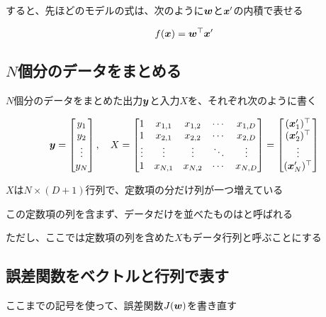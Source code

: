 \documentclass[../../../topic_machine-learning]{subfiles}
\begin{document}
すると、先ほどのモデルの式は、次のように$\vb*{w}$と$\vb*{x}'$の内積で表せる

\begin{equation*}
  f(\vb*{x}) = \vb*{w}^\top\vb*{x}'
\end{equation*}

\subsection{$N$個分のデータをまとめる}

$N$個分のデータをまとめた出力$\vb*{y}$と入力$X$を、それぞれ次のように書く

\begin{equation*}
  \vb*{y} = \begin{bmatrix}
    y_1    \\
    y_2    \\
    \vdots \\
    y_N
  \end{bmatrix},\quad
  X = \begin{bmatrix}
    1      & x_{1,1} & x_{1,2} & \cdots & x_{1,D} \\
    1      & x_{2,1} & x_{2,2} & \cdots & x_{2,D} \\
    \vdots & \vdots  & \vdots  & \ddots & \vdots  \\
    1      & x_{N,1} & x_{N,2} & \cdots & x_{N,D}
  \end{bmatrix} = \begin{bmatrix}
    (\vb*{x}'_1)^\top \\
    (\vb*{x}'_2)^\top \\
    \vdots            \\
    (\vb*{x}'_N)^\top
  \end{bmatrix}
\end{equation*}

$X$は$N\times(D+1)$行列で、定数項の分だけ列が一つ増えている

\br

この定数項の列を含まず、データだけを並べたものはと呼ばれる

ただし、ここでは定数項の列を含めた$X$もデータ行列と呼ぶことにする

\subsection{誤差関数をベクトルと行列で表す}

ここまでの記号を使って、誤差関数$J(\vb*{w})$を書き直す
\end{document}
